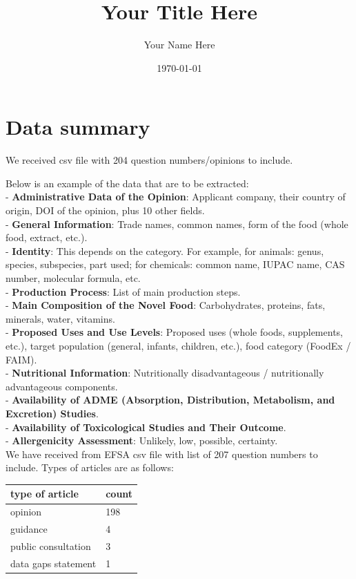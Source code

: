 \documentclass[12pt]{article}
\title{Your Title Here}
\author{Your Name Here}
\date{\today}
\begin{document}
\maketitle

\section{Data summary}
We received csv file with 204 question numbers/opinions to include.

Below is an example of the data that are to be extracted:\\
- \textbf{Administrative Data of the Opinion}: Applicant company, their country of origin, DOI of the opinion, plus 10 other fields.\\
- \textbf{General Information}: Trade names, common names, form of the food (whole food, extract, etc.).\\
- \textbf{Identity}: This depends on the category. For example, for animals: genus, species, subspecies, part used; for chemicals: common name, IUPAC name, CAS number, molecular formula, etc.\\
- \textbf{Production Process}: List of main production steps.\\
- \textbf{Main Composition of the Novel Food}: Carbohydrates, proteins, fats, minerals, water, vitamins.\\
- \textbf{Proposed Uses and Use Levels}: Proposed uses (whole foods, supplements, etc.), target population (general, infants, children, etc.), food category (FoodEx / FAIM).\\
- \textbf{Nutritional Information}: Nutritionally disadvantageous / nutritionally advantageous components.\\
- \textbf{Availability of ADME (Absorption, Distribution, Metabolism, and Excretion) Studies}.\\
- \textbf{Availability of Toxicological Studies and Their Outcome}.\\
- \textbf{Allergenicity Assessment}: Unlikely, low, possible, certainty.\\

We have received from EFSA csv file with list of 207 question numbers to include.
Types of articles are as follows:
\begin{center}
    \begin{tabular}{| l | l |}
    \hline
    \textbf{type of article} & \textbf{count} \\
    \hline
    opinion & 198 \\ 
    guidance & 4 \\  
    public consultation & 3 \\
    data gaps statement & 1  \\
    \hline
    \end{tabular}
\end{center}
\end{document}
